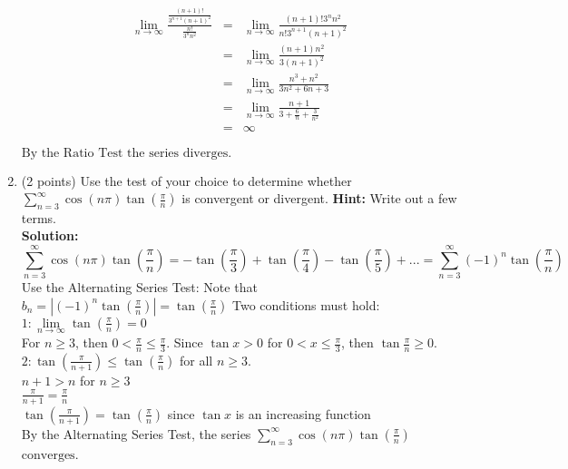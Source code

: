 \documentclass[paper=a4, fontsize=11pt]{scrartcl} %
\numberwithin{equation}{section} %
\numberwithin{figure}{section} %
\numberwithin{table}{section} %
\begin{document}
\begin{enumerate}
\begin{eqnarray*}
\lim\limits_{n \rightarrow\infty} \frac{\frac{(n+1)!}{3^{n+1}(n+1)^2}}{\frac{n!}{3^n n^2}}&=&\lim\limits_{n \rightarrow\infty} \frac{(n+1)!3^n n^2}{n! 3^{n+1}(n+1)^2}\\
&=&\lim\limits_{n \rightarrow\infty} \frac{(n+1) n^2}{ 3(n+1)^2}\\
&=&\lim\limits_{n \rightarrow\infty} \frac{n^3+n^2}{ 3n^2+6n+3} \\
&=&\lim\limits_{n \rightarrow\infty} \frac{n+1}{ 3+\frac{6}{n}+\frac{3}{n^2}}  \\
&=& \infty
\end{eqnarray*}

$\boxed{ \text{By the Ratio Test the series diverges.}}$

\newpage

\item (2 points) Use the test of your choice to determine whether 
$\sum\limits_{n=3}^\infty \cos (n \pi) \tan (\frac{\pi}{n})$ is convergent or divergent. \textbf{Hint:} Write out a few terms.\\
\noindent\textbf{Solution:}\\
\begin{equation*}
\sum\limits_{n=3}^\infty \cos (n \pi) \tan (\frac{\pi}{n}) = -\tan (\frac{\pi}{3}) + \tan (\frac{\pi}{4}) -\tan (\frac{\pi}{5}) + ... = \sum\limits_{n=3}^\infty (-1)^n \tan (\frac{\pi}{n})
\end{equation*}
Use the Alternating Series Test:  Note that $b_n = |(-1)^n \tan (\frac{\pi}{n})| =\tan (\frac{\pi}{n}) $
Two conditions must hold: \\
$1: \lim\limits_{n \rightarrow\infty} \tan \left( \frac{\pi}{n} \right) = 0$ \\
For $n \ge 3$, then $0<\frac{\pi}{n} \le \frac{\pi}{3}$.  Since $\tan x > 0$ for $0 < x \le \frac{\pi}{3}$, then $\tan \frac{\pi}{n} \ge 0$.\\

$2: \tan \left( \frac{\pi}{n+1}  \right) \le \tan \left( \frac{\pi}{n}  \right) $ for all $n \ge 3$. \\
$n+1 > n$ for $n \ge 3$\\
$\frac{\pi}{n+1} =\frac{\pi}{n}$ \\
$\tan \left( \frac{\pi}{n+1} \right) = \tan \left( \frac{\pi}{n} \right)$ since $\tan x$ is an increasing function\\

By the Alternating Series Test, the series $\sum\limits_{n=3}^\infty \cos (n \pi) \tan (\frac{\pi}{n})$ $\boxed{\text{converges}}$.


\end{enumerate}
\end{document}
